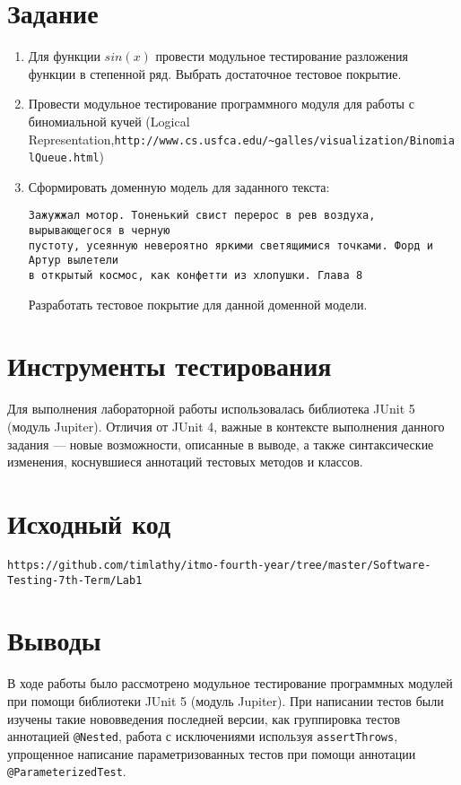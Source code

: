 \documentclass[listings]{labreport}
\begin{document}
\maketitlepage

\section*{Задание}

\begin{enumerate}
  \item Для функции $sin(x)$ провести модульное тестирование разложения функции в степенной ряд. Выбрать достаточное тестовое покрытие.
  \item Провести модульное тестирование программного модуля для работы с биномиальной кучей
    (Logical Representation,\newline\verb|http://www.cs.usfca.edu/~galles/visualization/BinomialQueue.html|)
  \item Сформировать доменную модель для заданного текста:
\begin{verbatim}
Зажужжал мотор. Тоненький свист перерос в рев воздуха, вырывающегося в черную
пустоту, усеянную невероятно яркими светящимися точками. Форд и Артур вылетели
в открытый космос, как конфетти из хлопушки. Глава 8
\end{verbatim}
    Разработать тестовое покрытие для данной доменной модели.
\end{enumerate}

\section*{Инструменты тестирования}

Для выполнения лабораторной работы использовалась библиотека JUnit 5 (модуль Jupiter).
Отличия от JUnit 4, важные в контексте выполнения данного задания — новые возможности,
описанные в выводе, а также синтаксические изменения, коснувшиеся аннотаций
тестовых методов и классов.

\section*{Исходный код}

\verb|https://github.com/timlathy/itmo-fourth-year/tree/master/Software-Testing-7th-Term/Lab1|

\section*{Выводы}

В ходе работы было рассмотрено модульное тестирование программных модулей
при помощи библиотеки JUnit 5 (модуль Jupiter). При написании тестов были изучены
такие нововведения последней версии, как группировка тестов аннотацией \verb|@Nested|,
работа с исключениями используя \verb|assertThrows|, упрощенное написание
параметризованных тестов при помощи аннотации \verb|@ParameterizedTest|.
\end{document}
